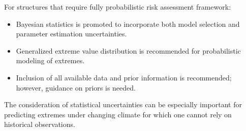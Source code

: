 \noindent For structures that require fully probabilistic risk assessment framework:
\begin{itemize}  
	\item Bayesian statistics is promoted to incorporate both model selection and parameter estimation uncertainties.  
	\item Generalized extreme value distribution is recommended for probabilistic modeling of extremes.
	\item Inclusion of all available data and prior information is recommended; however, guidance on priors is needed.
\end{itemize} 

The consideration of statistical uncertainties can be especially important for predicting extremes under changing climate for which one cannot rely on historical observations.

 


